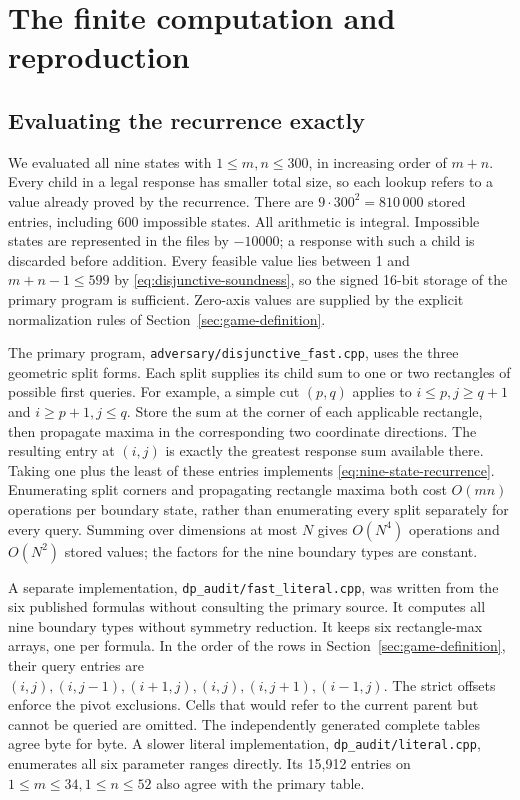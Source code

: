 \documentclass[11pt]{article}
\theoremstyle{definition}
\theoremstyle{remark}
\begin{document}
\section{The finite computation and reproduction}
\label{sec:computation}

\subsection{Evaluating the recurrence exactly}
We evaluated all nine states with $1\le m,n\le300$, in increasing order
of $m+n$. Every child in a legal response has smaller total size, so each
lookup refers to a value already proved by the recurrence. There are
$9\cdot300^2=810\,000$ stored entries, including 600 impossible states.
All arithmetic is integral. Impossible states are represented in the files
by $-10000$; a response with such a child is discarded before addition.
Every feasible value lies between 1 and $m+n-1\le599$ by
\eqref{eq:disjunctive-soundness}, so the signed 16-bit storage of the primary
program is sufficient. Zero-axis values are supplied by the explicit
normalization rules of Section~\ref{sec:game-definition}.

The primary program, \texttt{adversary/disjunctive\_fast.cpp}, uses the
three geometric split forms. Each split supplies its child sum to one or
two rectangles of possible first queries. For example, a simple cut
$(p,q)$ applies to $i\le p,j\ge q+1$ and $i\ge p+1,j\le q$.
Store the sum at the corner of each applicable rectangle, then propagate
maxima in the corresponding two coordinate directions. The resulting
entry at $(i,j)$ is exactly the greatest response sum available there.
Taking one plus the least of these entries implements
\eqref{eq:nine-state-recurrence}. Enumerating split corners and propagating
rectangle maxima both cost $O(mn)$ operations per boundary state, rather
than enumerating every split separately for every query. Summing over
dimensions at most $N$ gives $O(N^4)$ operations and $O(N^2)$ stored values;
the factors for the nine boundary types are constant.

A separate implementation, \texttt{dp\_audit/fast\_literal.cpp}, was
written from the six published formulas without consulting the primary
source. It computes all nine boundary types without symmetry reduction.
It keeps six rectangle-max arrays, one per formula. In the order of the
rows in Section~\ref{sec:game-definition}, their query entries are
$(i,j),(i,j-1),(i+1,j),(i,j),(i,j+1),(i-1,j)$.
The strict offsets enforce the pivot exclusions. Cells that would refer
to the current parent but cannot be queried are omitted.
The independently generated complete tables agree byte for byte.
A slower literal implementation, \texttt{dp\_audit/literal.cpp}, enumerates
all six parameter ranges directly. Its 15,912 entries on
$1\le m\le34,1\le n\le52$ also agree with the primary table.
\end{document}
